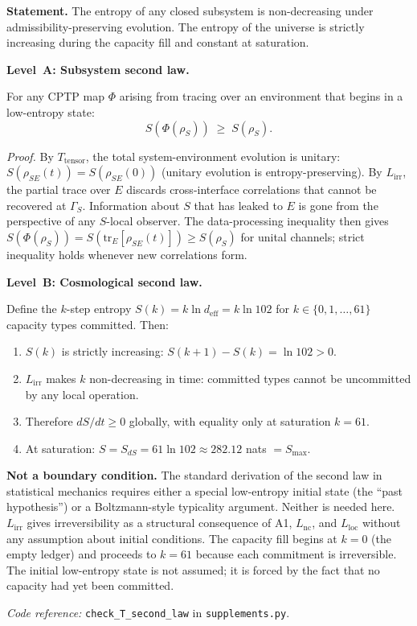 \documentclass[11pt]{article}
\newcommand{\coderef}[2]{\smallskip\noindent\textit{Code reference:} \texttt{#1} in \texttt{#2}.}
\newcommand{\epitag}[1]{\textbf{[#1]}}
\begin{document}
\begin{tcolorbox}[apfbox, title={Theorem $T_{\mathrm{second\,law}}$ (Second Law of Thermodynamics) \epitag{P}}]
\textbf{Statement.}  The entropy of any closed subsystem is non-decreasing
under admissibility-preserving evolution.  The entropy of the universe is
strictly increasing during the capacity fill and constant at saturation.

\medskip\noindent\textbf{Level~A: Subsystem second law.}

For any CPTP map $\Phi$ arising from tracing over an environment that begins
in a low-entropy state:
\[
  S(\Phi(\rho_S)) \;\geq\; S(\rho_S).
\]

\textit{Proof.}  By $T_{\mathrm{tensor}}$, the total system-environment
evolution is unitary: $S(\rho_{SE}(t)) = S(\rho_{SE}(0))$ (unitary evolution
is entropy-preserving).  By $L_{\mathrm{irr}}$, the partial trace over $E$
discards cross-interface correlations that cannot be recovered at $\Gamma_S$.
Information about $S$ that has leaked to $E$ is gone from the perspective of
any $S$-local observer.  The data-processing inequality then gives
$S(\Phi(\rho_S)) = S(\mathrm{tr}_E[\rho_{SE}(t)]) \geq S(\rho_S)$ for
unital channels; strict inequality holds whenever new correlations form.

\medskip\noindent\textbf{Level~B: Cosmological second law.}

Define the $k$-step entropy $S(k) = k\ln d_{\mathrm{eff}} = k\ln 102$ for
$k \in \{0, 1, \ldots, 61\}$ capacity types committed.  Then:
\begin{enumerate}[nosep]
\item $S(k)$ is strictly increasing: $S(k+1) - S(k) = \ln 102 > 0$.
\item $L_{\mathrm{irr}}$ makes $k$ non-decreasing in time: committed types
  cannot be uncommitted by any local operation.
\item Therefore $dS/dt \geq 0$ globally, with equality only at saturation
  $k = 61$.
\item At saturation: $S = S_{dS} = 61\ln 102 \approx 282.12$ nats $= S_{\max}$.
\end{enumerate}

\medskip\noindent\textbf{Not a boundary condition.}  The standard derivation
of the second law in statistical mechanics requires either a special
low-entropy initial state (the ``past hypothesis'') or a Boltzmann-style
typicality argument.  Neither is needed here.  $L_{\mathrm{irr}}$ gives
irreversibility as a structural consequence of A1, $L_{\mathrm{nc}}$, and
$L_{\mathrm{loc}}$ without any assumption about initial conditions.  The
capacity fill begins at $k=0$ (the empty ledger) and proceeds to $k=61$
because each commitment is irreversible.  The initial low-entropy state is
not assumed; it is forced by the fact that no capacity had yet been committed.

\coderef{check\_T\_second\_law}{supplements.py}
\end{tcolorbox}
\end{document}
